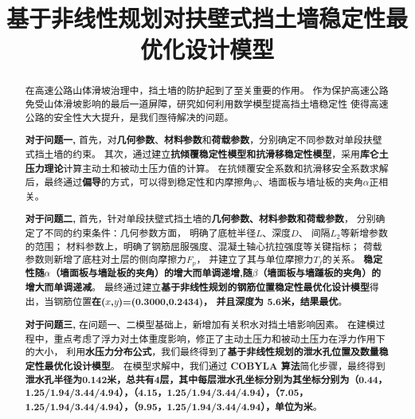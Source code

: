 \documentclass[withoutpreface,bwprint]{cumcmthesis}
\title{基于非线性规划对扶壁式挡土墙稳定性最优化设计模型}  %
\begin{document}
\maketitle
\begin{abstract}%
在高速公路山体滑坡治理中，挡土墙的防护起到了至关重要的作用。
作为保护高速公路免受山体滑坡影响的最后一道屏障，研究如何利用数学模型提高挡土墙稳定性
使得高速公路的安全性大大提升，是我们亟待解决的问题。
\par
\textbf{对于问题一,}
首先，对\textbf{几何参数}、\textbf{材料参数}和\textbf{荷载参数}，分别确定不同参数对单段扶壁式挡土墙的约束。
其次，通过建立\textbf{抗倾覆稳定性模型和抗滑移稳定性模型}，采用\textbf{库仑土压力理论}计算主动土和被动土压力值的计算。
在抗倾覆安全系数和抗滑移安全系数求解后，最终通过\textbf{偏导}的方式，可以得到稳定性和内摩擦角$\varphi$、墙面板与墙址板的夹角$\alpha$正相关。


\par
\textbf{对于问题二,}
首先，针对单段扶壁式挡土墙的\textbf{几何参数、材料参数和荷载参数}，
分别确定了不同的约束条件：几何参数方面，
明确了底桩半径\(L\)、深度\(D\)、
间隔\(L_2\)等新增参数的范围；
材料参数上，明确了钢筋屈服强度、混凝土轴心抗拉强度等关键指标；
荷载参数则新增了底柱对土层的侧向摩擦力\(F_p\)，
并建立了其与单位摩擦力\(T_f\)的关系。
\textbf{稳定性随$\alpha$（墙面板与墙趾板的夹角）的增大而单调递增,随$\beta$（墙面板与墙踵板的夹角）的增大而单调递减}。
最终通过建立\textbf{基于非线性规划的钢筋位置稳定性最优化设计模型}得出，当钢筋位置\textbf{在($x$,$y$)=(0.3000,0.2434)， 并且深度为 5.6米，结果最优}。

\par
\textbf{对于问题三,}
在问题一、二模型基础上，新增加有关积水对挡土墙影响因素。
在建模过程中，重点考虑了浮力对土体重度影响，修正了主动土压力和被动土压力在浮力作用下的大小，
利用\textbf{水压力分布公式}，我们最终得到了\textbf{基于非线性规划的泄水孔位置及数量稳定性最优化设计模型}。
在模型求解中，我们通过 \textbf{COBYLA 算法}简化步骤，最终得到\textbf{泄水孔半径为0.142米，总共有4层，其中每层泄水孔坐标分别为其坐标分别为（0.44，1.25/1.94/3.44/4.94），（4.15，1.25/1.94/3.44/4.94），（7.05，1.25/1.94/3.44/4.94），（9.95，1.25/1.94/3.44/4.94），单位为米}。
\par
\end{abstract}


\end{document}
